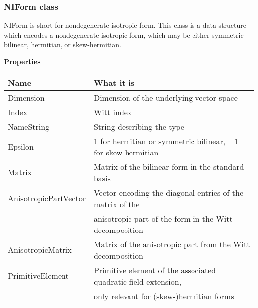 \documentclass[12pt]{article}
\theoremstyle{definition}
\numberwithin{theorem}{subsection}
\newcommand{\tbf}{\textbf}
\newcommand{\noi}{\noindent}
\begin{document}


\subsubsection{NIForm class}

NIForm is short for nondegenerate isotropic form. This class is a data structure which encodes a nondegenerate isotropic form, which may be either symmetric bilinear, hermitian, or skew-hermitian.

\begin{center}
\tbf{Properties}
\end{center}

\begin{center}
	\begin{tabular}{l|l}
		Name & What it is \\
		\hline
		Dimension & Dimension of the underlying vector space \\
		Index & Witt index \\
		NameString & String describing the type \\
		Epsilon & 1 for hermitian or symmetric bilinear, $-1$ for skew-hermitian \\
		Matrix & Matrix of the bilinear form in the standard basis \\
		AnisotropicPartVector & Vector encoding the diagonal entries of the matrix of the \\
		& \qquad anisotropic part of the form in the Witt decomposition \\
		AnisotropicMatrix & Matrix of the anisotropic part from the Witt decomposition \\
		PrimitiveElement & Primitive element of the associated quadratic field extension, \\
		& \qquad only relevant for (skew-)hermitian forms
	\end{tabular}
\end{center}
\end{document}
